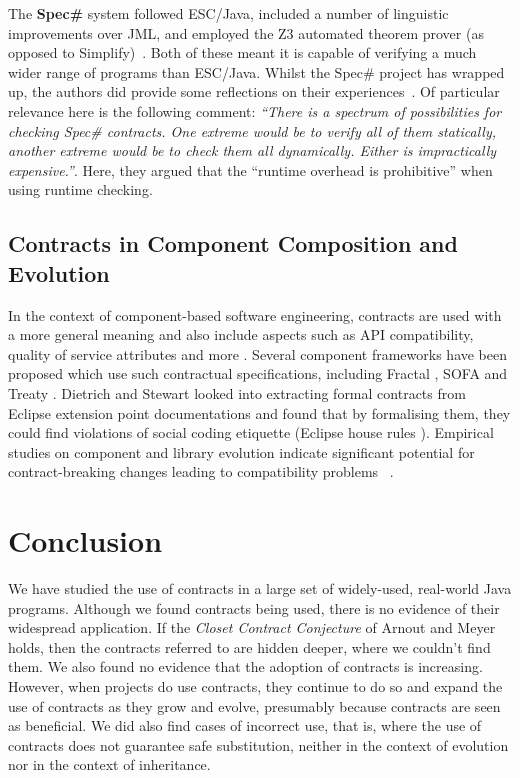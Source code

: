 \documentclass[a4paper,UKenglish]{lipics-v2016}
\begin{document}
The {\bf Spec\#} system followed ESC/Java, included a number of linguistic improvements over JML, and employed the Z3 automated theorem prover (as opposed to Simplify)~\cite{MB08}.  Both of these meant it is capable of verifying a much wider range of programs than ESC/Java.  Whilst the Spec\# project has wrapped up, the authors did provide some reflections on their experiences~\cite{BFLMSV11}.  Of particular relevance here is the following comment: \textit{``There  is  a  spectrum  of  possibilities  for  checking  Spec\# contracts.  One extreme would be to verify all of them statically, another extreme would be to check them all dynamically.   Either  is  impractically  expensive.''}.  Here, they argued that the ``runtime overhead is prohibitive'' when using runtime checking.  


\subsection{Contracts in Component Composition and Evolution}

In the context of component-based software engineering, contracts are used with a more general meaning and also include aspects such as API compatibility, quality of service attributes and more \cite{beugnard99making}. Several component frameworks have been proposed which use such contractual specifications, including Fractal \cite{bruneton2006fractal}, SOFA \cite{plasil2002behavior} and Treaty \cite{dietrich2009components}. Dietrich and Stewart \cite{DS10} looked into extracting formal contracts from Eclipse  extension point documentations and found that by formalising them, they could find violations of social coding etiquette (Eclipse house rules \cite{gamma2004contributing}). Empirical studies on component and library evolution indicate significant potential for contract-breaking changes leading to compatibility problems ~\cite{RDV14,DJB14,bauml09automated,DS10}.



\section{Conclusion}

We have studied the use of contracts in a large set of widely-used, real-world Java programs.  Although we found contracts being used, there is no evidence of their widespread application.  If the {\em Closet Contract Conjecture} of Arnout and Meyer holds, then the contracts referred to are hidden deeper, where we couldn't find them. We also found no evidence that the adoption of contracts is increasing. However, when projects do use contracts, they continue to do so and expand the use of contracts as they grow and evolve, presumably because contracts are seen as beneficial. We did also find cases of incorrect use, that is, where the use of contracts does not guarantee safe substitution, neither in the context of evolution nor in the context of inheritance.  
\end{document}
